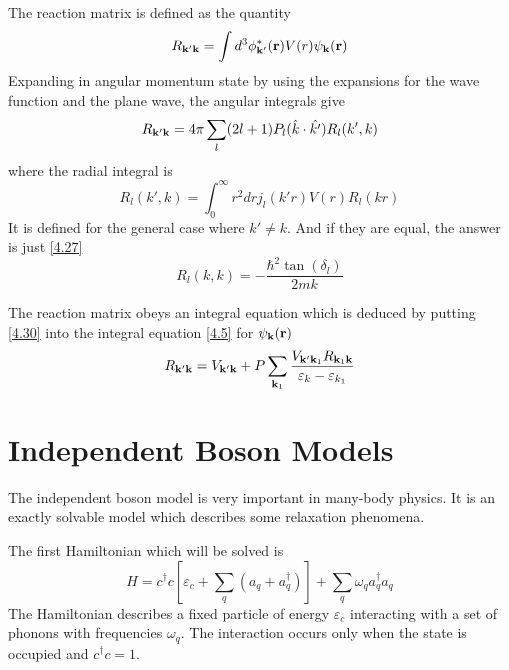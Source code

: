 The reaction matrix is defined as the quantity
\begin{equation}
    R_{\mathbf{k}' \mathbf{k}} = \int d^3 \phi^*_{\mathbf{k}'}(\mathbf{r}) V(r) \psi_{\mathbf{k}}(\mathbf{r})  \label{4.30}
\end{equation}
Expanding in angular momentum state by using the expansions for the wave function and the plane wave, the angular integrals give
\begin{equation}
    R_{\mathbf{k}'\mathbf{k}} = 4\pi \sum_l(2l+1) P_l(\hat{k}\cdot \hat{k'} ) R_l(k',k)   \label{4.31}
\end{equation}
where the radial integral is
\begin{equation}
    R_l(k',k) = \int_0^\infty r^2 dr j_l(k'r) V(r) R_l(kr)  \label{4.32}
\end{equation}
It is defined for the general case where $k' \neq k$.
And if they are equal, the answer is just \eqref{4.27}
\begin{equation}
    R_l(k,k) = -\frac{\hbar^2 \tan(\delta_l)}{2mk}  \label{4.33}
\end{equation}

The reaction matrix obeys an integral equation which is deduced by putting \eqref{4.30} into the integral equation \eqref{4.5} for $\psi_{\mathbf{k}}(\mathbf{r})$
\begin{equation}
    R_{\mathbf{k}'\mathbf{k}} = V_{\mathbf{k}'\mathbf{k}} + P \sum_{\mathbf{k}_1} \frac{V_{\mathbf{k}'\mathbf{k}_1} R_{\mathbf{k}_1 \mathbf{k}}}{\varepsilon_k -\varepsilon_{k_1}} \label{4.34}
\end{equation}

\section{Independent Boson Models}\label{4.3}
The independent boson model is very important in many-body physics.
It is an exactly solvable model which describes some relaxation phenomena.

The first Hamiltonian which will be solved is
\begin{equation}
    H = c^\dagger c \left[ \varepsilon_c + \sum_q \left( a_q + a_q^\dagger \right) \right] + \sum_q \omega_q a^\dagger_q a_q    \label{4.198}
\end{equation}
The Hamiltonian describes a fixed particle of energy $\varepsilon_c$ interacting with a set of phonons with frequencies $\omega_q$.
The interaction occurs only when the state is  occupied and $c^\dagger c = 1$.

